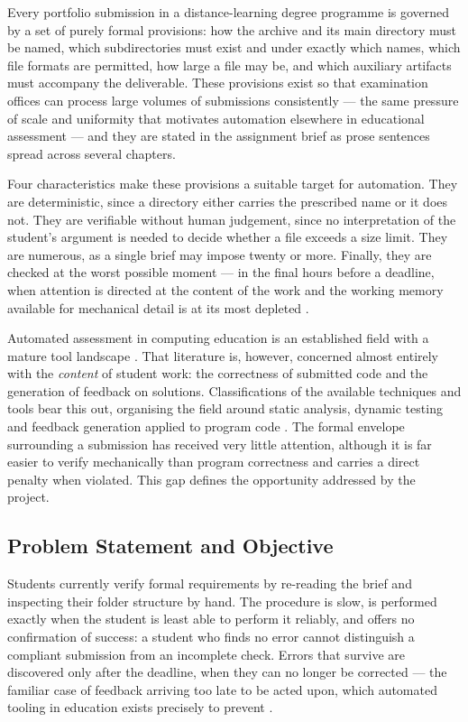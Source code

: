 \documentclass[a4paper,11pt]{article}
\begin{document}
Every portfolio submission in a distance-learning degree programme is governed
by a set of purely formal provisions: how the archive and its main directory
must be named, which subdirectories must exist and under exactly which names,
which file formats are permitted, how large a file may be, and which auxiliary
artifacts must accompany the deliverable. These provisions exist so that
examination offices can process large volumes of submissions consistently ---
the same pressure of scale and uniformity that motivates automation elsewhere in
educational assessment \citep{Paiva2022} --- and they are stated in the
assignment brief as prose sentences spread across several chapters.

Four characteristics make these provisions a suitable target for automation.
They are deterministic, since a directory either carries the prescribed name or
it does not. They are verifiable without human judgement, since no
interpretation of the student's argument is needed to decide whether a file
exceeds a size limit. They are numerous, as a single brief may impose twenty or
more. Finally, they are checked at the worst possible moment --- in the final
hours before a deadline, when attention is directed at the content of the work
and the working memory available for mechanical detail is at its most depleted
\citep{Hermans2021}.

Automated assessment in computing education is an established field with a
mature tool landscape \citep{Paiva2022, Messer2024}. That literature is, however,
concerned almost entirely with the \textit{content} of student work: the
correctness of submitted code and the generation of feedback on solutions.
Classifications of the available techniques and tools bear this out, organising
the field around static analysis, dynamic testing and feedback generation
applied to program code \citep{Combefis2022}. The formal envelope surrounding a
submission has received very little attention,
although it is far easier to verify mechanically than program correctness and
carries a direct penalty when violated. This gap defines the opportunity
addressed by the project.

\subsection{Problem Statement and Objective}\label{subsec:problem}

Students currently verify formal requirements by re-reading the brief and
inspecting their folder structure by hand. The procedure is slow, is performed
exactly when the student is least able to perform it reliably, and offers no
confirmation of success: a student who finds no error cannot distinguish a
compliant submission from an incomplete check. Errors that survive are
discovered only after the deadline, when they can no longer be corrected --- the
familiar case of feedback arriving too late to be acted upon, which automated
tooling in education exists precisely to prevent \citep{Messer2024}.
\end{document}
